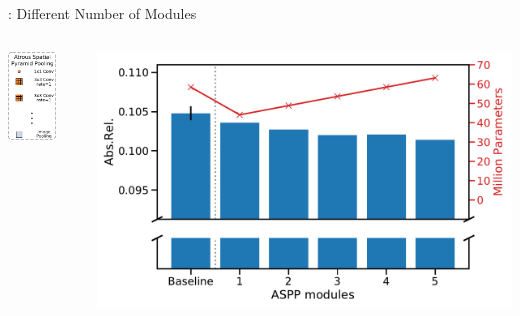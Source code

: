 \documentclass[11pt]{beamer}
\begin{document}
\begin{frame}[c]{\subsecname: Different Number of Modules}
    \begin{columns}
            \begin{column}{0.3\textwidth}
            \centering
            \includegraphics[width=0.7\textwidth]{figures/architecture/aspp-module-dynamic.pdf}
            \end{column}%
            \pause
            \begin{column}{0.8\textwidth}
              \centering
              \includegraphics[width=1.0\textwidth]{figures/results/experiment2_AbsRel.pdf}
            \end{column}
    \end{columns}
\end{frame}
\end{document}
